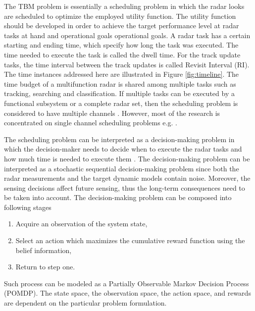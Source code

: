 \documentclass[english, 12pt, a4paper, elec, utf8, a-1b, online]{aaltothesis}
\begin{document}
The TBM problem is essentially a scheduling problem in which the radar looks are scheduled to optimize the employed utility function.
The utility function should be developed in order to achieve the target performance level at radar tasks at hand and operational goals operational goals.
A radar task has a certain starting and ending time, which specify how long the task was executed.
The time needed to execute the task is called the dwell time.
For the track update tasks, the time interval between the track updates is called Revisit Interval (RI).
The time instances addressed here are illustrated in Figure \ref{fig:timeline}.
The time budget of a multifunction radar is shared among multiple tasks such as tracking, searching and classification.
If multiple tasks can be executed by a functional subsystem or a complete radar set, then the scheduling problem is considered to have multiple channels \cite{Shaghaghi2018}.
However, most of the research is concentrated on single channel scheduling problems e.g. \cite{Charlish2015a, Byrne2015, Byrne2016, Esfahani2012, Wintenby2006}.

The scheduling problem can be interpreted as a decision-making problem in which the decision-maker needs to decide when to execute the radar tasks and how much time is needed to execute them \cite{Wintenby2006}.  
The decision-making problem can be interpreted as a stochastic sequential decision-making problem since both the radar measurements and the target dynamic models contain noise.
Moreover, the sensing decisions affect future sensing, thus the long-term consequences need to be taken into account.
The decision-making problem can be composed into following stages
\begin{enumerate}
    \item Acquire an observation of the system state,
    \item Select an action which maximizes the cumulative reward function using the belief information,
    \item Return to step one.
\end{enumerate}
Such process can be modeled as a Partially Observable Markov Decision Process (POMDP).
The state space, the observation space, the action space, and rewards are dependent on the particular problem formulation.
\end{document}
